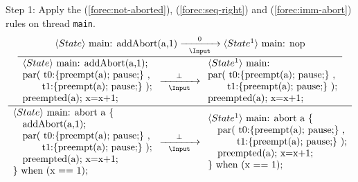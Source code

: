 \noindent
Step 1: Apply the (\ref{forec:not-aborted}), (\ref{forec:seq-right}) and (\ref{forec:imm-abort})
rules on thread \verb$main$.
\begin{equation*}
	\frac{
		\dfrac{
				\langle State \rangle ~ \text{main: addAbort(a,1)}
					\xrightarrow[~~\Input~~]{0}
				 \langle State^1 \rangle ~ \text{main: nop}
			}{
				\begin{array}{l}
					\langle State \rangle ~ \text{main: addAbort(a,1);}	\\
					\text{par( t0:\{preempt(a); pause;\} ,}				\\
					\text{~~~~~~t1:\{preempt(a); pause;\} );}			\\
					\text{preempted(a); x=x+1;}							
				\end{array}
					\xrightarrow[~~\Input~~]{\bot} 
				\begin{array}{l}
					\langle State^1 \rangle ~ \text{main:}		\\
					\text{par( t0:\{preempt(a); pause;\} ,}		\\
					\text{~~~~~~t1:\{preempt(a); pause;\} );}	\\
					\text{preempted(a); x=x+1;}							
				\end{array}
			}
		}{
			\begin{array}{l}
				\langle State \rangle ~ \text{main: abort a \{}	\\
				\text{~~~addAbort(a,1);}						\\
				\text{~~~par( t0:\{preempt(a); pause;\} ,}		\\
				\text{~~~~~~~~~t1:\{preempt(a); pause;\} );}	\\
				\text{~~~preempted(a); x=x+1;}					\\
				\text{\} when (x == 1);}						
			\end{array}
				\xrightarrow[~~\Input~~]{\bot} 
			\begin{array}{l}
				\langle State^1 \rangle ~ \text{main: abort a \{}	\\
				\text{~~~par( t0:\{preempt(a); pause;\} ,}			\\
				\text{~~~~~~~~~t1:\{preempt(a); pause;\} );}		\\
				\text{~~~preempted(a); x=x+1;}						\\
				\text{\} when (x == 1);}							
			\end{array}
		}
\end{equation*}

